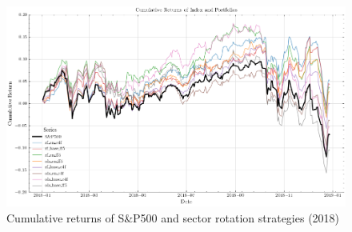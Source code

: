 



\begin{figure}[H]
    \centering
    \includegraphics[width=\textwidth]{plots/results/cum_ret_plot.png}
    \caption{Cumulative returns of S\&P500 and sector rotation strategies (2018)}\label{fig:cum_ret_plot}
\end{figure}



